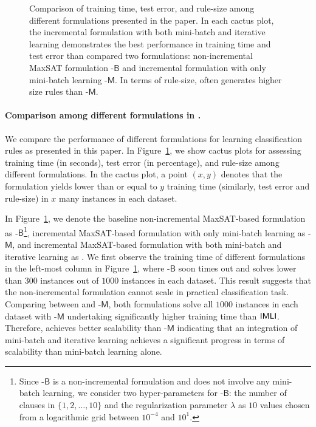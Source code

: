 \begin{figure}[!t]
	
	\caption{Comparison of training time, test error, and rule-size among different formulations presented in the paper. In each cactus plot, the incremental formulation {\imli} with both mini-batch and iterative learning demonstrates the best performance in training time and test error than compared two formulations: non-incremental MaxSAT formulation {\imli}-$\mathsf{B}$ and incremental formulation with only mini-batch learning {\imli}-$\mathsf{M}$. In terms of rule-size, {\imli} often generates higher size rules than {\imli}-$\mathsf{M}$.}
	\label{interpretability_imli_fig:different_formulations}
\end{figure}



\paragraph{Comparison among different formulations in {\imli}.}  We compare the performance of different formulations for learning classification rules as presented in this paper. In Figure~\ref{interpretability_imli_fig:different_formulations}, we show cactus plots for assessing training time (in seconds), test error (in percentage), and rule-size among different formulations. In the cactus plot, a point $ (x,y) $ denotes that the formulation yields lower than or equal to $ y $ training time (similarly, test error and rule-size) in $ x $ many instances in each dataset.

In Figure~\ref{interpretability_imli_fig:different_formulations}, we denote the baseline non-incremental MaxSAT-based formulation as {\imli}-$\mathsf{B}$\footnote{Since  {\imli}-$\mathsf{B}$ is a non-incremental formulation and does not involve any mini-batch learning, we consider two hyper-parameters for {\imli}-$\mathsf{B}$: the number of clauses in $ \{1, 2, \dots, 10\} $ and the regularization parameter $ \lambda $ as $ 10 $ values chosen from a logarithmic grid between $ 10^{-4} $ and $ 10^1 $.}, incremental MaxSAT-based formulation with only mini-batch learning as {\imli}-$\mathsf{M}$, and incremental MaxSAT-based formulation with both mini-batch and iterative learning as {\imli}.  We first observe the training time of different formulations in the left-most column in Figure~\ref{interpretability_imli_fig:different_formulations}, where {\imli}-$\mathsf{B}$ soon times out and solves lower than $ 300 $ instances out of $ 1000 $ instances in each dataset. This result suggests that the non-incremental formulation cannot scale in practical classification task. Comparing between {\imli} and {\imli}-$\mathsf{M}$, both formulations solve all $ 1000 $ instances in each dataset with {\imli}-$\mathsf{M}$ undertaking significantly higher training time than $ {\mathsf{IMLI}} $.  Therefore, {\imli} achieves better scalability than {\imli}-$\mathsf{M}$ indicating that an integration of mini-batch and iterative learning achieves a significant progress in terms of scalability than mini-batch learning alone. 

